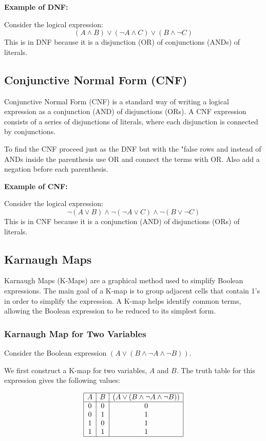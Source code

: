 \textbf{Example of DNF:}

Consider the logical expression:
\[
	(A \land B) \lor (\neg A \land C) \lor (B \land \neg C)
\]
This is in DNF because it is a disjunction (OR) of conjunctions (ANDs) of literals.

\subsection{Conjunctive Normal Form (CNF)}

Conjunctive Normal Form (CNF) is a standard way of writing a logical expression as a conjunction (AND)
of disjunctions (ORs). A CNF expression consists of a series of disjunctions of
literals, where each disjunction is connected by conjunctions.

To find the CNF proceed just as the DNF but with the "false rows and instead
of ANDs inside the parenthesis use OR and connect the terms with OR. Also add a negation before each parenthesis.

\textbf{Example of CNF:}

Consider the logical expression:
\[
	\neg (A \lor B) \land \neg (\neg A \lor C) \land \neg (B \lor \neg C)
\]
This is in CNF because it is a conjunction (AND) of disjunctions (ORs) of literals.

\subsection{Karnaugh Maps}

Karnaugh Maps (K-Maps) are a graphical method used to simplify Boolean expressions. The main goal of a K-map is to group adjacent cells that contain 1's in order to simplify the expression. A K-map helps identify common terms, allowing the Boolean expression to be reduced to its simplest form.

\subsubsection{Karnaugh Map for Two Variables}

Consider the Boolean expression \( (A \lor (B \land \neg A \land \neg B)) \).

We first construct a K-map for two variables, \( A \) and \( B \). The truth table for this expression gives the following values:

\[
	\begin{array}{|c|c|c|}
		\hline
		A & B & (A \lor (B \land \neg A \land \neg B)) \\
		\hline
		0 & 0 & 0                                      \\
		0 & 1 & 1                                      \\
		1 & 0 & 1                                      \\
		1 & 1 & 1                                      \\
		\hline
	\end{array}
\]


